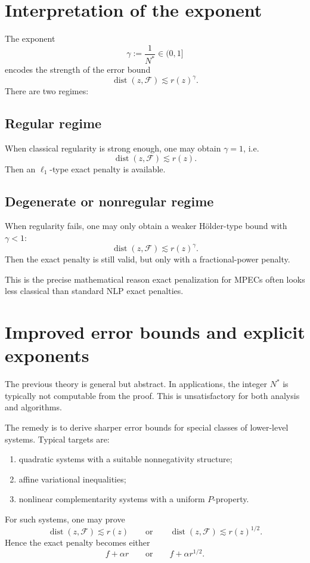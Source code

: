 \documentclass[pdflatex,sn-mathphys-num]{sn-jnl}%
\theoremstyle{definition}
\newcommand{\dist}{\operatorname{dist}}
\newcommand{\cF}{\mathcal{F}}
\begin{document}
\section{Interpretation of the exponent}

The exponent
\[
\gamma := \frac{1}{N^\ast}\in (0,1]
\]
encodes the strength of the error bound
\[
\dist(z,\cF)\lesssim r(z)^\gamma.
\]
There are two regimes:

\subsection*{Regular regime}
When classical regularity is strong enough, one may obtain $\gamma=1$, i.e.
\[
\dist(z,\cF)\lesssim r(z).
\]
Then an $\ell_1$-type exact penalty is available.

\subsection*{Degenerate or nonregular regime}
When regularity fails, one may only obtain a weaker Hölder-type bound with $\gamma<1$:
\[
\dist(z,\cF)\lesssim r(z)^\gamma.
\]
Then the exact penalty is still valid, but only with a fractional-power penalty.

This is the precise mathematical reason exact penalization for MPECs often looks less classical than standard NLP exact penalties.

\section{Improved error bounds and explicit exponents}

The previous theory is general but abstract. In applications, the integer $N^\ast$ is typically not computable from the proof. This is unsatisfactory for both analysis and algorithms.

The remedy is to derive sharper error bounds for special classes of lower-level systems. Typical targets are:

\begin{enumerate}[label=(\roman*)]
    \item quadratic systems with a suitable nonnegativity structure;
    \item affine variational inequalities;
    \item nonlinear complementarity systems with a uniform $P$-property.
\end{enumerate}

For such systems, one may prove
\[
\dist(z,\cF)\lesssim r(z) \qquad \text{or}\qquad \dist(z,\cF)\lesssim r(z)^{1/2}.
\]
Hence the exact penalty becomes either
\[
f+\alpha r
\qquad \text{or}\qquad
f+\alpha r^{1/2}.
\]
\end{document}
